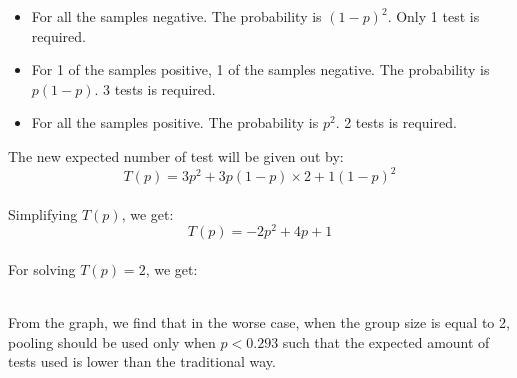 \begin{itemize}
  \item For all the samples negative. The probability is $(1-p)^2$. Only 1 test is required.
  \item For 1 of the samples positive, 1 of the samples negative. The probability is $p(1-p)$. 3 tests is required. 
  \item For all the samples positive. The probability is $p^2$. 2 tests is required.
\end{itemize}
The new expected number of test will be given out by:
\\
\begin{displaymath}
T(p)=3p^2 + 3p(1-p) \times 2 + 1(1-p)^2
\end{displaymath}
\\
Simplifying $T(p)$, we get:
\\
\begin{displaymath}
T(p)=-2p^2+4p+1
\end{displaymath}
\\
For solving $T(p)=2$, we get:
\\
\begin{center}
\end{center}
\\
From the graph, we find that in the worse case, when the group size is equal to 2, pooling should be used only when $p<0.293$ such that the expected amount of tests used is lower than the traditional way.
